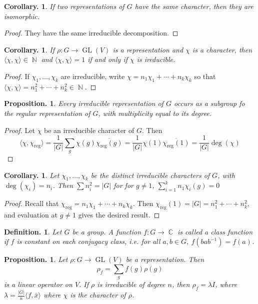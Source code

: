 \documentclass[11pt, a4paper]{memoir}
\DeclareMathOperator{\N}{{\mathbb{N}}}
\DeclareMathOperator{\C}{{\mathbb{C}}}
\theoremstyle{change}
\newtheorem{corollary}[theorem]{Corollary.}
\newtheorem{proposition}[theorem]{Proposition.}
\theoremstyle{plain}
\theoremstyle{nonumberplain}
\newtheorem{definition}{Definition.}
\newtheorem{proof}{Proof}
\DeclareMathOperator{\GL}{GL}
\numberwithin{equation}{section}
\begin{document}
\begin{corollary}
    If two representations of $G$ have the same character, then they are isomorphic.
\end{corollary}
\begin{proof}
    They have the same irreducible decomposition.
\end{proof}
\begin{corollary}
    If $\rho:G\to\GL(V)$ is a representation and $\chi$ is a character, then $\langle\chi,\chi\rangle\in\N$ and $\langle\chi,\chi\rangle=1$ if and only if $\chi$ is ireducible.
\end{corollary}
\begin{proof}
    If $\chi_1,\ldots,\chi_k$ are irreducible, write $\chi=n_1\chi_1+\cdots+n_k\chi_k$ so that $\langle\chi,\chi\rangle=n_1^2+\cdots+n_k^2\in\N$.
\end{proof}
\begin{proposition}
    Every irreducible representation of $G$ occurs as a subgroup fo the regular representation of $G$, with multiplicity equal to its degree.
\end{proposition}
\begin{proof}
    Let $\chi$ be an irreducible character of $G$.
    Then
    \begin{equation*}
        \langle\chi,\chi_{\text{reg}}\rangle=\frac{1}{|G|}\sum_g\chi(g)\overline{\chi_{\text{reg}}(g)}=\frac{1}{|G|}\chi(1)\overline{\chi_{\text{reg}}(1)}=\frac{1}{|G|}\deg(\chi)
    \end{equation*}
\end{proof}
\begin{corollary}
    Let $\chi_1,\ldots,\chi_k$ be the distinct irreducible characters of $G$, with $\deg(\chi_i)=n_i$.
    Then $\sum n_i^2=|G|$ for for $g\neq 1$, $\sum_{i=1}^kn_1\chi_i(g)=0$
\end{corollary}
\begin{proof}
    Recall that $\chi_{\text{reg}}=n_1\chi_1+\cdots+n_k\chi_k$.
    Then $\chi_{\text{reg}}(1)=|G|=n_1^2+\cdots+n_k^2$, and evaluation at $g\neq 1$ gives the desired result.
\end{proof}
\begin{definition}
    Let $G$ be a group.
    A function $f:G\to\C$ is called a class function if $f$ is constant on each conjugacy class, i.e. for all $a,b\in G$, $f(bab^{-1})=f(a)$.
\end{definition}
\begin{proposition}
    Let $\rho:G\to\GL(V)$ be a representation.
    Then
    \begin{equation*}
        \rho_f=\sum_g f(g)\rho(g)
    \end{equation*}
    is a linear operator on $V$.
    If $\rho$ is irreducible of degree $n$, then $\rho_f=\lambda I$, where $\lambda=\frac{|G|}{n}\langle f,\overline{x}\rangle$ where $\chi$ is the character of $\rho$.
\end{proposition}
\end{document}
